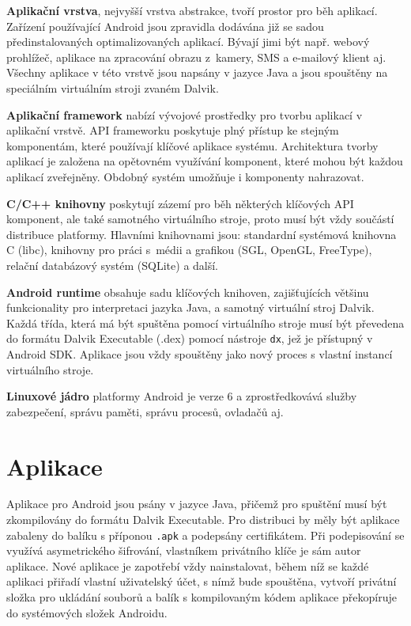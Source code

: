 \textbf{Aplikační vrstva}, nejvyšší vrstva abstrakce, tvoří prostor pro běh
aplikací. Zařízení používající Android jsou zpravidla dodávána již se sadou
předinstalovaných optimalizovaných aplikací. Bývají jimi být např. webový prohlížeč, aplikace na zpracování obrazu z~kamery, SMS a e-mailový klient aj. Všechny aplikace v této vrstvě jsou napsány v jazyce Java a jsou spouštěny na speciálním virtuálním stroji zvaném Dalvik.

\bigskip \textbf{Aplikační framework} nabízí vývojové prostředky pro tvorbu aplikací
v aplikační vrstvě. API frameworku poskytuje plný přístup ke stejným komponentám, které používají klíčové aplikace systému. Architektura tvorby aplikací je založena na opětovném využívání komponent, které mohou být každou aplikací zveřejněny. Obdobný systém umožňuje i komponenty nahrazovat.

\bigskip \textbf{C/C++ knihovny} poskytují zázemí pro běh některých klíčových
API komponent, ale také samotného virtuálního stroje, proto musí být vždy
součástí distribuce platformy. Hlavními knihovnami jsou: standardní systémová knihovna C (libc), knihovny pro práci s~médii a grafikou (SGL, OpenGL, FreeType), relační databázový systém (SQLite) a další.

\bigskip \textbf{Android runtime} obsahuje sadu klíčových knihoven,
zajišťujících většinu funkcionality pro interpretaci jazyka Java, a samotný
virtuální stroj Dalvik. Každá třída, která má být spuštěna pomocí virtuálního
stroje musí být převedena do formátu Dalvik Executable (.dex) pomocí nástroje
\texttt{dx}, jež je přístupný v Android SDK. Aplikace jsou vždy
spouštěny jako nový proces s vlastní instancí virtuálního stroje.

\bigskip \textbf{Linuxové jádro} platformy Android je verze 6 a zprostředkovává
služby zabezpečení, správu paměti, správu procesů, ovladačů aj.

\section{Aplikace}

Aplikace pro Android jsou psány v jazyce Java, přičemž pro spuštění musí být
zkompilovány do formátu Dalvik Executable. Pro distribuci by měly být aplikace
zabaleny do balíku s příponou \texttt{.apk} a podepsány certifikátem. Při
podepisování se využívá asymetrického šifrování, vlastníkem privátního klíče je sám autor
aplikace. Nové aplikace je zapotřebí vždy nainstalovat, během níž se každé
aplikaci přiřadí vlastní uživatelský účet, s nímž bude spouštěna, vytvoří
privátní složka pro ukládání souborů a balík s kompilovaným kódem aplikace
překopíruje do systémových složek Androidu.

